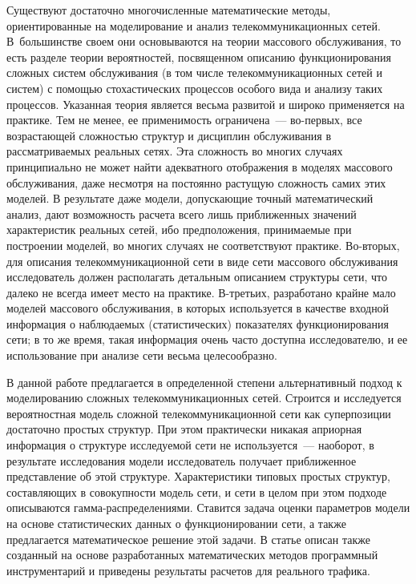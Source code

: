 \begin{multicols}{2}
Существуют достаточно многочисленные математические методы, ориентированные на
моделирование и анализ телекоммуникационных сетей. В~большинстве своем они
основываются на теории массового обслуживания, то есть разделе теории
вероятностей, посвященном описанию функционирования сложных систем обслуживания
(в том чис\-ле телекоммуникационных сетей и систем) с помощью стохастических
процессов особого вида и анализу таких процессов. Указанная теория является
весьма развитой и широко применяется на практике. Тем не менее, ее применимость
ограничена~--- во-первых, все возрастающей сложностью структур и дисциплин
обслуживания в рас\-смат\-ри\-ва\-емых реальных сетях. Эта сложность во многих
случаях принципиально не может найти адекватного отображения в моделях
массового обслуживания, даже несмотря на постоянно растущую сложность самих
этих моделей. В результате даже модели, допускающие точный математический
анализ, дают возможность расчета всего лишь приближенных значений характеристик
реальных сетей, ибо предположения, принимаемые при построении моделей, во
многих случаях не соответствуют практике. Во-вторых, для описания
телекоммуникационной сети в виде сети массового обслуживания исследователь
должен располагать детальным описанием структуры сети, что далеко не всегда
имеет мес\-то на практике. В-третьих, разработано крайне мало моделей массового
обслуживания, в которых используется в качестве входной информация о
наблюдаемых (статистических) показателях функционирования сети; в то же время,
такая информация очень часто доступна исследователю, и ее использование при
анализе сети весьма целесообразно.

В данной работе предлагается в определенной степени альтернативный подход к
моделированию сложных телекоммуникационных сетей. Строится и исследуется
вероятностная модель сложной телекоммуникационной сети как суперпозиции
достаточно простых структур. При этом практически никакая априорная информация
о структуре исследуемой сети не используется~--- наоборот, в результате
исследования модели исследователь получает приближенное представление об этой
структуре. Характеристики типовых простых структур, составляющих в совокупности
модель сети, и сети в целом при этом подходе описываются
гам\-ма-рас\-пре\-де\-ле\-ни\-я\-ми. Ставится задача оценки параметров модели
на основе статистических данных о функционировании сети, а также предлагается
математическое решение этой задачи. В статье описан также созданный на основе
разработанных математических методов программный инструментарий и приведены
результаты расчетов для реального трафика. {

}
\end{multicols}
